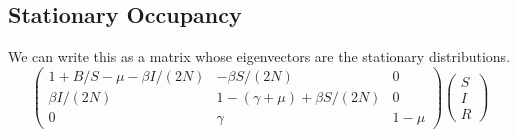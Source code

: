 
\subsection{Stationary Occupancy}
We can write this as a matrix whose eigenvectors are the stationary
distributions.
\begin{equation}
 \left( \begin{array}{ccc}
   1+B/S-\mu -\beta I/(2N) & -\beta S/(2N) & 0 \\
   \beta I/(2N) & 1-(\gamma+\mu)+\beta S/(2N) & 0 \\
   0 & \gamma & 1-\mu
 \end{array}\right)
 \left(\begin{array}{c}S \\ I \\ R \end{array}\right)
\end{equation}
